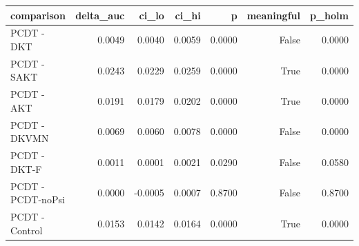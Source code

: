 \begin{tabular}{lrrrrrr}
\toprule
comparison & delta\_auc & ci\_lo & ci\_hi & p & meaningful & p\_holm \\
\midrule
PCDT - DKT & 0.0049 & 0.0040 & 0.0059 & 0.0000 & False & 0.0000 \\
PCDT - SAKT & 0.0243 & 0.0229 & 0.0259 & 0.0000 & True & 0.0000 \\
PCDT - AKT & 0.0191 & 0.0179 & 0.0202 & 0.0000 & True & 0.0000 \\
PCDT - DKVMN & 0.0069 & 0.0060 & 0.0078 & 0.0000 & False & 0.0000 \\
PCDT - DKT-F & 0.0011 & 0.0001 & 0.0021 & 0.0290 & False & 0.0580 \\
PCDT - PCDT-noPsi & 0.0000 & -0.0005 & 0.0007 & 0.8700 & False & 0.8700 \\
PCDT - Control & 0.0153 & 0.0142 & 0.0164 & 0.0000 & True & 0.0000 \\
\bottomrule
\end{tabular}
